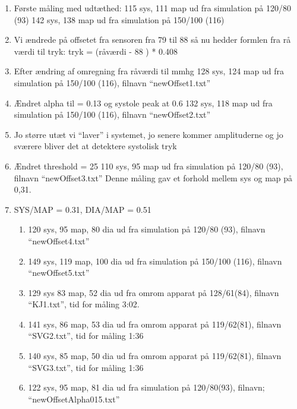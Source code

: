 \begin{enumerate}
	\item Første måling med udtæthed: 
	115 sys, 111 map ud fra simulation på 120/80 (93)
	142 sys, 138 map ud fra simulation på 150/100 (116)
	
	\item Vi ændrede på offsetet fra sensoren fra 79 til 88 så nu hedder formlen fra rå værdi til tryk: 
	tryk = (råværdi - 88 ) * 0.408
	
	\item Efter ændring af omregning fra råværdi til mmhg 
	128 sys, 124 map ud fra simulation på 150/100 (116), filnavn “newOffset1.txt” 
	
	\item Ændret alpha til = 0.13 og systole peak at 0.6
	132 sys, 118 map ud fra simulation på 150/100 (116), filnavn “newOffset2.txt” 
	
	\item Jo større utæt vi “laver” i systemet, jo senere kommer amplituderne og jo sværere bliver det at detektere systolisk tryk
	
	\item Ændret threshold = 25
	110 sys, 95 map ud fra simulation på 120/80 (93), filnavn “newOffset3.txt” 
	Denne måling gav et forhold mellem sys og map på 0,31. 
	
	\item SYS/MAP = 0.31, DIA/MAP = 0.51 
	\begin{enumerate}
		\item 120 sys, 95 map, 80 dia ud fra simulation på 120/80 (93), filnavn “newOffset4.txt” 
		\item 149 sys, 119 map, 100 dia ud fra simulation på 150/100 (116), filnavn “newOffset5.txt” 
		\item 129 sys 83 map, 52 dia ud fra omrom apparat på 128/61(84), filnavn “KJ1.txt”, tid for måling 3:02. 
		\item 141 sys, 86 map, 53 dia ud fra omrom apparat på 119/62(81), filnavn “SVG2.txt”, tid for måling 1:36
		\item 140 sys, 85 map, 50 dia ud fra omrom apparat på 119/62(81), filnavn “SVG3.txt”, tid for måling 1:36
		\item 122 sys, 95 map, 81 dia ud fra simulation på 120/80(93), filnavn; “newOffsetAlpha015.txt”
	\end{enumerate}
\end{enumerate}
